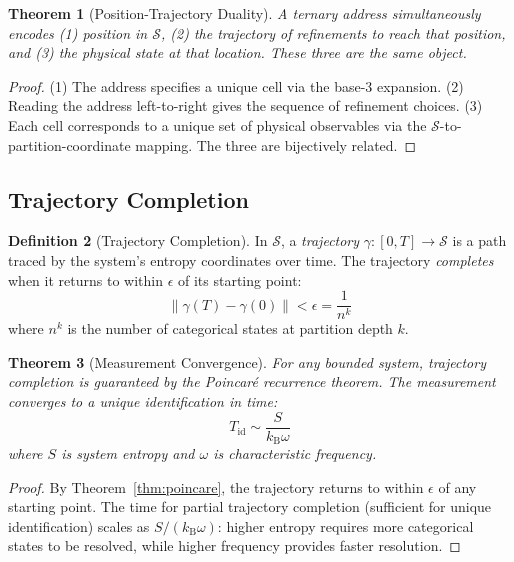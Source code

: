 \documentclass[11pt,twocolumn,a4paper]{article}
\newtheorem{theorem}{Theorem}[section]
\theoremstyle{definition}
\newtheorem{definition}[theorem]{Definition}
\theoremstyle{remark}
\newcommand{\kB}{k_{\mathrm{B}}}
\newcommand{\Sspace}{\mathcal{S}}
\begin{document}
\begin{theorem}[Position-Trajectory Duality]
\label{thm:position_trajectory}
A ternary address simultaneously encodes (1) position in $\Sspace$, (2) the trajectory of refinements to reach that position, and (3) the physical state at that location. These three are the same object.
\end{theorem}

\begin{proof}
(1) The address specifies a unique cell via the base-3 expansion. (2) Reading the address left-to-right gives the sequence of refinement choices. (3) Each cell corresponds to a unique set of physical observables via the $\Sspace$-to-partition-coordinate mapping. The three are bijectively related.
\end{proof}

\subsection{Trajectory Completion}

\begin{definition}[Trajectory Completion]
\label{def:trajectory}
In $\Sspace$, a \emph{trajectory} $\gamma: [0,T] \to \Sspace$ is a path traced by the system's entropy coordinates over time. The trajectory \emph{completes} when it returns to within $\epsilon$ of its starting point:
\begin{equation}
\|\gamma(T) - \gamma(0)\| < \epsilon = \frac{1}{n^k}
\end{equation}
where $n^k$ is the number of categorical states at partition depth $k$.
\end{definition}

\begin{theorem}[Measurement Convergence]
\label{thm:convergence}
For any bounded system, trajectory completion is guaranteed by the Poincar\'e recurrence theorem. The measurement converges to a unique identification in time:
\begin{equation}
T_{\mathrm{id}} \sim \frac{S}{\kB \omega}
\end{equation}
where $S$ is system entropy and $\omega$ is characteristic frequency.
\end{theorem}

\begin{proof}
By Theorem~\ref{thm:poincare}, the trajectory returns to within $\epsilon$ of any starting point. The time for partial trajectory completion (sufficient for unique identification) scales as $S/(\kB \omega)$: higher entropy requires more categorical states to be resolved, while higher frequency provides faster resolution.
\end{proof}
\end{document}
